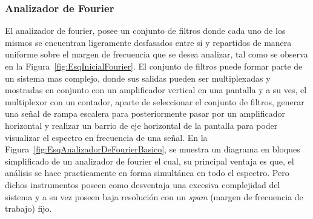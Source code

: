 \subsubsection{Analizador de Fourier }
    
    El analizador de fourier, posee un conjunto de filtros donde cada uno de los 
    mismos se encuentran ligeramente desfasados entre si y repartidos de manera 
    uniforme sobre el margen de frecuencia que se desea analizar, tal como se observa
    en la Figura~\ref{fig:EsqInicialFourier}. El conjunto de filtros puede formar 
    parte de un sistema mas complejo, donde sus salidas pueden ser multiplexadas 
    y mostradas en conjunto con un amplificador vertical en una pantalla y a su ves, 
    el multiplexor con un contador, aparte de seleccionar el conjunto de filtros, 
    generar una señal de rampa escalera para posteriormente pasar por un 
    amplificador horizontal y realizar un barrio de eje horizontal de la pantalla 
    para poder visualizar el espectro en frecuencia de una señal. En la 
    Figura~\ref{fig:EsqAnalizadorDeFourierBasico}, se muestra un diagrama en bloques 
    simplificado de un analizador de fourier el cual, su principal 
    ventaja es que, el análisis se hace practicamente en forma simultánea en todo 
    el espectro. Pero dichos instrumentos poseen como desventaja una excesiva 
    complejidad del sistema y a su vez poseen baja resolución con un \textit{spam} 
    (margen de frecuencia de trabajo) fijo.
